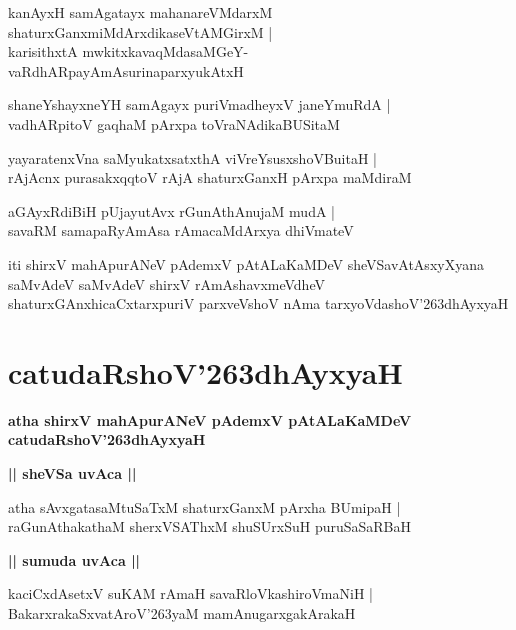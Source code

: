 \documentclass[twoside,12pt,openright]{book}
\def\S{\char'263}
\newcounter{shloka}[chapter]
\def\uvaca#1{\centerline{{\large\textbf{#1}}}}
\begin{document}
\begin{shloka}%
kanAyxH samAgatayx mahanareVMdarxM \\
shaturxGanxmiMdArxdikaseVtAMGirxM |\\
karisithxtA mwkitxkavaqMdasaMGeY-\\
vaRdhARpayAmAsurinaparxyukAtxH 
\end{shloka}

\begin{shloka}%
shaneYshayxneYH samAgayx puriVmadheyxV janeYmuRdA |\\
vadhARpitoV gaqhaM pArxpa toVraNAdikaBUSitaM 
\end{shloka}

\begin{shloka}%
yayaratenxVna saMyukatxsatxthA viVreYsusxshoVBuitaH |\\
rAjAcnx purasakxqqtoV rAjA shaturxGanxH pArxpa maMdiraM 
\end{shloka}

\begin{shloka}%
aGAyxRdiBiH pUjayutAvx rGunAthAnujaM mudA |\\
savaRM samapaRyAmAsa rAmacaMdArxya dhiVmateV 
\end{shloka}

\begin{center}
iti shirxV mahApurANeV pAdemxV pAtALaKaMDeV sheVSavAtAsxyXyana saMvAdeV 
saMvAdeV shirxV rAmAshavxmeVdheV shaturxGAnxhicaCxtarxpuriV parxveVshoV nAma tarxyoVdashoV\S dhAyxyaH
\end{center}

\chapter{catudaRshoV\S dhAyxyaH}

\begin{center}
{\LARGE\bfseries atha shirxV mahApurANeV pAdemxV pAtALaKaMDeV catudaRshoV\S dhAyxyaH}
\end{center}

\uvaca{|| sheVSa uvAca ||}

\begin{shloka}%
atha sAvxgatasaMtuSaTxM shaturxGanxM pArxha BUmipaH |\\
raGunAthakathaM sherxVSAThxM shuSUrxSuH puruSaSaRBaH 
\end{shloka}

\uvaca{|| sumuda uvAca ||}

\begin{shloka}%
kaciCxdAsetxV suKAM rAmaH savaRloVkashiroVmaNiH |\\
BakarxrakaSxvatAroV\S yaM mamAnugarxgakArakaH 
\end{shloka}
\end{document}
